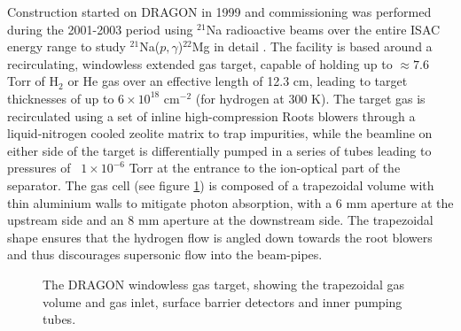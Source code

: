 Construction started on DRAGON in 1999 and commissioning was performed during the 2001-2003 period using $^{21}$Na radioactive beams over the entire ISAC energy range to study $^{21}$Na($p,\gamma$)$^{22}$Mg in detail \cite{dau04}. The facility is based around a recirculating, windowless extended gas target, capable of holding up to $\approx 7.6$ Torr of H$_{2}$ or He gas over an effective length of 12.3 cm, leading to target thicknesses of up to $6 \times 10^{18}$ cm$^{-2}$ (for hydrogen at 300 K). The target gas is recirculated using a set of inline high-compression Roots blowers through a liquid-nitrogen cooled zeolite matrix to trap impurities, while the beamline on either side of the target is differentially pumped in a series of tubes leading to pressures of ~$1\times 10^{-6}$ Torr at the entrance to the ion-optical part of the separator. The gas cell (see figure \ref{fig:dra_gas_target}) is composed of a trapezoidal volume with thin aluminium walls to mitigate photon absorption, with a 6 mm aperture at the upstream side and an 8 mm aperture at the downstream side. The trapezoidal shape ensures that the hydrogen flow is angled down towards the root blowers and thus discourages supersonic flow into the beam-pipes. 

\begin{figure}
\caption{The DRAGON windowless gas target, showing the trapezoidal gas volume and gas inlet, surface barrier detectors and inner pumping tubes.  }
\label{fig:dra_gas_target}
\end{figure}

